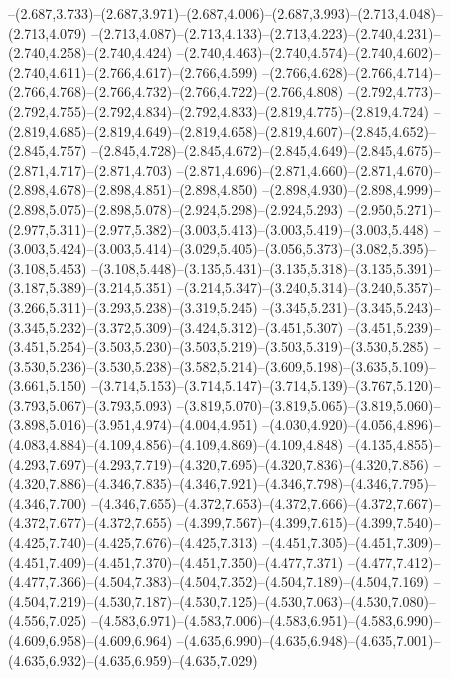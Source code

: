  --(2.687,3.733)--(2.687,3.971)--(2.687,4.006)--(2.687,3.993)--(2.713,4.048)--(2.713,4.079)%
  --(2.713,4.087)--(2.713,4.133)--(2.713,4.223)--(2.740,4.231)--(2.740,4.258)--(2.740,4.424)%
  --(2.740,4.463)--(2.740,4.574)--(2.740,4.602)--(2.740,4.611)--(2.766,4.617)--(2.766,4.599)%
  --(2.766,4.628)--(2.766,4.714)--(2.766,4.768)--(2.766,4.732)--(2.766,4.722)--(2.766,4.808)%
  --(2.792,4.773)--(2.792,4.755)--(2.792,4.834)--(2.792,4.833)--(2.819,4.775)--(2.819,4.724)%
  --(2.819,4.685)--(2.819,4.649)--(2.819,4.658)--(2.819,4.607)--(2.845,4.652)--(2.845,4.757)%
  --(2.845,4.728)--(2.845,4.672)--(2.845,4.649)--(2.845,4.675)--(2.871,4.717)--(2.871,4.703)%
  --(2.871,4.696)--(2.871,4.660)--(2.871,4.670)--(2.898,4.678)--(2.898,4.851)--(2.898,4.850)%
  --(2.898,4.930)--(2.898,4.999)--(2.898,5.075)--(2.898,5.078)--(2.924,5.298)--(2.924,5.293)%
  --(2.950,5.271)--(2.977,5.311)--(2.977,5.382)--(3.003,5.413)--(3.003,5.419)--(3.003,5.448)%
  --(3.003,5.424)--(3.003,5.414)--(3.029,5.405)--(3.056,5.373)--(3.082,5.395)--(3.108,5.453)%
  --(3.108,5.448)--(3.135,5.431)--(3.135,5.318)--(3.135,5.391)--(3.187,5.389)--(3.214,5.351)%
  --(3.214,5.347)--(3.240,5.314)--(3.240,5.357)--(3.266,5.311)--(3.293,5.238)--(3.319,5.245)%
  --(3.345,5.231)--(3.345,5.243)--(3.345,5.232)--(3.372,5.309)--(3.424,5.312)--(3.451,5.307)%
  --(3.451,5.239)--(3.451,5.254)--(3.503,5.230)--(3.503,5.219)--(3.503,5.319)--(3.530,5.285)%
  --(3.530,5.236)--(3.530,5.238)--(3.582,5.214)--(3.609,5.198)--(3.635,5.109)--(3.661,5.150)%
  --(3.714,5.153)--(3.714,5.147)--(3.714,5.139)--(3.767,5.120)--(3.793,5.067)--(3.793,5.093)%
  --(3.819,5.070)--(3.819,5.065)--(3.819,5.060)--(3.898,5.016)--(3.951,4.974)--(4.004,4.951)%
  --(4.030,4.920)--(4.056,4.896)--(4.083,4.884)--(4.109,4.856)--(4.109,4.869)--(4.109,4.848)%
  --(4.135,4.855)--(4.293,7.697)--(4.293,7.719)--(4.320,7.695)--(4.320,7.836)--(4.320,7.856)%
  --(4.320,7.886)--(4.346,7.835)--(4.346,7.921)--(4.346,7.798)--(4.346,7.795)--(4.346,7.700)%
  --(4.346,7.655)--(4.372,7.653)--(4.372,7.666)--(4.372,7.667)--(4.372,7.677)--(4.372,7.655)%
  --(4.399,7.567)--(4.399,7.615)--(4.399,7.540)--(4.425,7.740)--(4.425,7.676)--(4.425,7.313)%
  --(4.451,7.305)--(4.451,7.309)--(4.451,7.409)--(4.451,7.370)--(4.451,7.350)--(4.477,7.371)%
  --(4.477,7.412)--(4.477,7.366)--(4.504,7.383)--(4.504,7.352)--(4.504,7.189)--(4.504,7.169)%
  --(4.504,7.219)--(4.530,7.187)--(4.530,7.125)--(4.530,7.063)--(4.530,7.080)--(4.556,7.025)%
  --(4.583,6.971)--(4.583,7.006)--(4.583,6.951)--(4.583,6.990)--(4.609,6.958)--(4.609,6.964)%
  --(4.635,6.990)--(4.635,6.948)--(4.635,7.001)--(4.635,6.932)--(4.635,6.959)--(4.635,7.029)%
